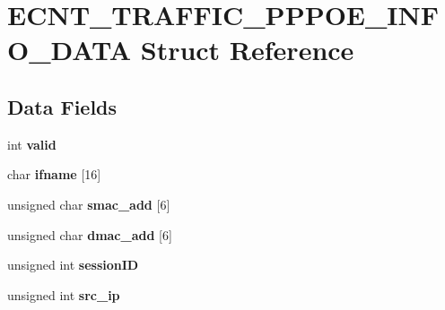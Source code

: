\hypertarget{structECNT__TRAFFIC__PPPOE__INFO__DATA}{}\section{E\+C\+N\+T\+\_\+\+T\+R\+A\+F\+F\+I\+C\+\_\+\+P\+P\+P\+O\+E\+\_\+\+I\+N\+F\+O\+\_\+\+D\+A\+TA Struct Reference}
\label{structECNT__TRAFFIC__PPPOE__INFO__DATA}
\subsection*{Data Fields}
\begin{DoxyCompactItemize}
\item 
\mbox{\label{structECNT__TRAFFIC__PPPOE__INFO__DATA_add45847677a4f5605c60ad3b8e049ae3}} 
int {\bfseries valid}
\item 
\mbox{\label{structECNT__TRAFFIC__PPPOE__INFO__DATA_a2a464de0854176f969eacf24bcb2768c}} 
char {\bfseries ifname} \mbox{[}16\mbox{]}
\item 
\mbox{\label{structECNT__TRAFFIC__PPPOE__INFO__DATA_ada96439c442e04be69920e8915a8b926}} 
unsigned char {\bfseries smac\+\_\+add} \mbox{[}6\mbox{]}
\item 
\mbox{\label{structECNT__TRAFFIC__PPPOE__INFO__DATA_ab2754998baf314ea28980e743f80aea5}} 
unsigned char {\bfseries dmac\+\_\+add} \mbox{[}6\mbox{]}
\item 
\mbox{\label{structECNT__TRAFFIC__PPPOE__INFO__DATA_a1c04692e26721ca39664b187549aeb90}} 
unsigned int {\bfseries session\+ID}
\item 
\mbox{\label{structECNT__TRAFFIC__PPPOE__INFO__DATA_a4d27cb31475b048fd0be590edc77ab2f}} 
unsigned int {\bfseries src\+\_\+ip}
\item 
\mbox{\label{structECNT__TRAFFIC__PPPOE__INFO__DATA_aa6bdaa534599996d1aed5a15fa2cfd38}} 

\end{DoxyCompactItemize}
